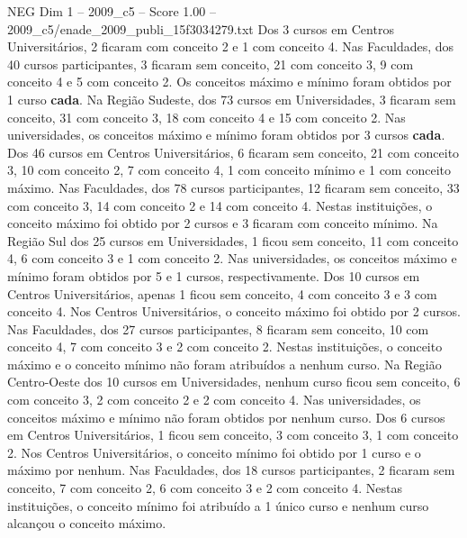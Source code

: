 \begin{textsample}{NEG Dim 1 – 2009\_c5 – Score 1.00 – 2009\_c5/enade\_2009\_publi\_15f3034279.txt}
Dos 3 cursos em Centros Universitários, 2 ficaram com conceito 2 e 1 com conceito 4.
Nas Faculdades, dos 40 cursos participantes, 3 ficaram sem conceito, 21 com conceito 3, 9 com conceito 4 e 5 com conceito 2.
Os conceitos máximo e mínimo foram obtidos por 1 curso \textbf{cada}.
Na Região Sudeste, dos 73 cursos em Universidades, 3 ficaram sem conceito, 31 com conceito 3, 18 com conceito 4 e 15 com conceito 2.
Nas universidades, os conceitos máximo e mínimo foram obtidos por 3 cursos \textbf{cada}.
Dos 46 cursos em Centros Universitários, 6 ficaram sem conceito, 21 com conceito 3, 10 com conceito 2, 7 com conceito 4, 1 com conceito mínimo e 1 com conceito máximo.
Nas Faculdades, dos 78 cursos participantes, 12 ficaram sem conceito, 33 com conceito 3, 14 com conceito 2 e 14 com conceito 4.
Nestas instituições, o conceito máximo foi obtido por 2 cursos e 3 ficaram com conceito mínimo.
Na Região Sul dos 25 cursos em Universidades, 1 ficou sem conceito, 11 com conceito 4, 6 com conceito 3 e 1 com conceito 2.
Nas universidades, os conceitos máximo e mínimo foram obtidos por 5 e 1 cursos, respectivamente.
Dos 10 cursos em Centros Universitários, apenas 1 ficou sem conceito, 4 com conceito 3 e 3 com conceito 4.
Nos Centros Universitários, o conceito máximo foi obtido por 2 cursos.
Nas Faculdades, dos 27 cursos participantes, 8 ficaram sem conceito, 10 com conceito 4, 7 com conceito 3 e 2 com conceito 2.
Nestas instituições, o conceito máximo e o conceito mínimo não foram atribuídos a nenhum curso.
Na Região Centro-Oeste dos 10 cursos em Universidades, nenhum curso ficou sem conceito, 6 com conceito 3, 2 com conceito 2 e 2 com conceito 4.
Nas universidades, os conceitos máximo e mínimo não foram obtidos por nenhum curso.
Dos 6 cursos em Centros Universitários, 1 ficou sem conceito, 3 com conceito 3, 1 com conceito 2.
Nos Centros Universitários, o conceito mínimo foi obtido por 1 curso e o máximo por nenhum.
Nas Faculdades, dos 18 cursos participantes, 2 ficaram sem conceito, 7 com conceito 2, 6 com conceito 3 e 2 com conceito 4.
Nestas instituições, o conceito mínimo foi atribuído a 1 único curso e nenhum curso alcançou o conceito máximo.

\end{textsample}
